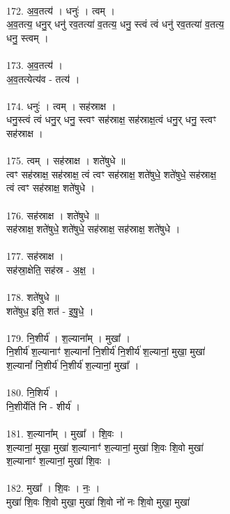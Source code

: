 \\
172. अ॒व॒तत्य॑ । धनुः॑ । त्वम् ।\\
अ॒व॒तत्य॒ धनु॒र् धनु॑ रव॒तत्या॑ व॒तत्य॒ धनु॒ स्त्वं त्वं धनु॑ रव॒तत्या॑ व॒तत्य॒\\
धनु॒ स्त्वम् ।\\
\\
173. अ॒व॒तत्य॑ ।\\
अ॒व॒तत्येत्य॑व - तत्य॑ ।\\
\\
174. धनुः॑ । त्वम् । सह॑स्राक्ष ।\\
धनु॒स्त्वं त्वं धनु॒र् धनु॒ स्त्वꣳ सह॑स्राक्ष॒ सह॑स्राक्ष॒त्वं धनु॒र् धनु॒ स्त्वꣳ\\
सह॑स्राक्ष ।\\
\\
175. त्वम् । सह॑स्राक्ष । शते॑षुधे ॥\\
त्वꣳ सह॑स्राक्ष॒ सह॑स्राक्ष॒ त्वं त्वꣳ सह॑स्राक्ष॒ शते॑षुधे॒ शते॑षुधे॒ सह॑स्राक्ष॒\\
त्वं त्वꣳ सह॑स्राक्ष॒ शते॑षुधे ।\\
\\
176. सह॑स्राक्ष । शते॑षुधे ॥\\
सह॑स्राक्ष॒ शते॑षुधे॒ शते॑षुधे॒ सह॑स्राक्ष॒ सह॑स्राक्ष॒ शते॑षुधे ।\\
\\
177. सह॑स्राक्ष ।\\
सह॑स्रा॒क्षेति॒ सह॑स्र - अ॒क्ष॒ ।\\
\\
178. शते॑षुधे ॥\\
शते॑षुध॒ इति॒ शत॑ - इ॒षु॒धे॒ ।\\
\\
179. नि॒शीर्य॑ । श॒ल्याना᳚म् । मुखा᳚ ।\\
नि॒शीर्य॑ श॒ल्यानाꣳ॑ श॒ल्यानां᳚ नि॒शीर्य॑ नि॒शीर्य॑ श॒ल्यानां॒ मुखा॒ मुखा॑\\
श॒ल्यानां᳚ नि॒शीर्य॑ नि॒शीर्य॑ श॒ल्यानां॒ मुखा᳚ ।\\
\\
180. नि॒शिर्य॑ ।\\
नि॒शीर्येति॑ नि - शीर्य॑ ।\\
\\
181. श॒ल्याना᳚म् । मुखा᳚ । शि॒वः ।\\
श॒ल्यानां॒ मुखा॒ मुखा॑ श॒ल्यानाꣳ॑ श॒ल्यानां॒ मुखा॑ शि॒वः शि॒वो मुखा॑\\
श॒ल्यानाꣳ॑ श॒ल्यानां॒ मुखा॑ शि॒वः ।\\
\\
182. मुखा᳚ । शि॒वः । नः॒ ।\\
मुखा॑ शि॒वः शि॒वो मुखा॒ मुखा॑ शि॒वो नो॑ नः शि॒वो मुखा॒ मुखा॑\\

